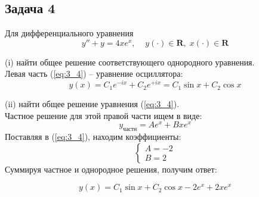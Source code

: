 \documentclass[a4paper, 12pt]{article}
\begin{document}
	\subsection* {Задача 4}

Для дифференциального уравнения
\begin{equation}
y''+y=4xe^x, \;\;\;\; y(\cdot)\in \textbf{R}, \; x(\cdot)\in \textbf{R}
\label{eq:3_4}
\end{equation}

(i) найти общее решение соответствующего однородного уравнения.\\
Левая часть (\ref{eq:3_4}) -- уравнение осциллятора:
\begin{equation}
y(x) = C_1e^{-ix}+C_2e^{+ix} = C_1\sin{x}+C_2\cos{x}
\label{eq:3_4}
\end{equation}

(ii) найти общее решение уравнения (\ref{eq:3_4}).\\
Частное решение для этой правой части ищем в виде:
\[ y_{\text{частн}} = Ae^{x}+Bxe^{x}\]
Поставляя в (\ref{eq:3_4}), находим коэффициенты: 
\[
\left\{
\begin{array}{lr}
A = -2 \\
B  = 2
\end{array}
\right.
\]
Суммируя частное и однородное решения, получим ответ:

\[y(x) =C_1\sin{x}+C_2\cos{x}-2e^x+2xe^x\]
\end{document}
